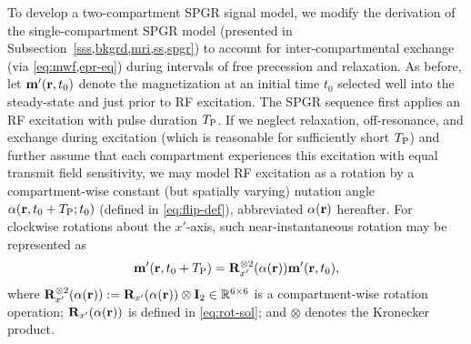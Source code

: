To develop a two-compartment SPGR signal model,
we modify the derivation 
of the single-compartment SPGR model
(presented in Subsection~\ref{sss,bkgrd,mri,ss,spgr})
to account for inter-compartmental exchange
(via \eqref{eq:mwf,epr-eq})
during intervals of free precession and relaxation.
As before,
let $\bmmp\prtz$ denote the magnetization
at an initial time $t_0$ selected 
well into the steady-state
and just prior to RF excitation.
The SPGR sequence first applies
an RF excitation
with pulse duration $T_\mathrm{P}$.
If we neglect relaxation,
off-resonance,
and exchange during excitation
(which is reasonable 
for sufficiently short $T_\mathrm{P}$) 
and further assume
that each compartment 
experiences this excitation
with equal transmit field sensitivity,
we may model RF excitation as a rotation
by a compartment-wise constant 
(but spatially varying)
nutation angle $\flip\prtzt{t_0+\TP}$
(defined in \eqref{eq:flip-def}),
abbreviated $\flip\pr$ hereafter.
For clockwise rotations
about the $x'$-axis,
such near-instantaneous rotation
may be represented as
\begin{align}
	\bmmp\paren{\bmr,t_0+\TP} = 
		\bmRxpsix{\flip\pr} \bmmp\prtz,
		\label{eq:mwf,spgr-ex}
\end{align}
where $\bmRxpsix{\flip\pr} := \bmRxp{\flip\pr} \otimes \eye{2} 
\in \reals{6 \times 6}$
is a compartment-wise rotation operation;
$\bmRxp{\flip\pr}$ is defined in \eqref{eq:rot-sol};
and $\otimes$ denotes the Kronecker product.

